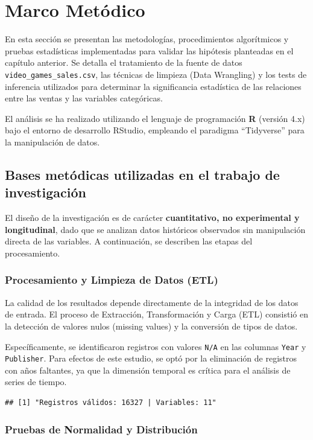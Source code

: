 \documentclass[oneside,11pt]{Latex/Classes/PhDthesisPSnPDF}
\begin{document}
\chapter{Marco Metódico}

En esta sección se presentan las metodologías, procedimientos
algorítmicos y pruebas estadísticas implementadas para validar las
hipótesis planteadas en el capítulo anterior. Se detalla el tratamiento
de la fuente de datos \texttt{video\_games\_sales.csv}, las técnicas de
limpieza (Data Wrangling) y los tests de inferencia utilizados para
determinar la significancia estadística de las relaciones entre las
ventas y las variables categóricas.

El análisis se ha realizado utilizando el lenguaje de programación
\textbf{R} (versión 4.x) bajo el entorno de desarrollo RStudio,
empleando el paradigma ``Tidyverse'' para la manipulación de datos.

\section{Bases metódicas utilizadas en el trabajo de investigación}

El diseño de la investigación es de carácter \textbf{cuantitativo, no
experimental y longitudinal}, dado que se analizan datos históricos
observados sin manipulación directa de las variables. A continuación, se
describen las etapas del procesamiento.

\subsection{Procesamiento y Limpieza de Datos (ETL)}

La calidad de los resultados depende directamente de la integridad de
los datos de entrada. El proceso de Extracción, Transformación y Carga
(ETL) consistió en la detección de valores nulos (missing values) y la
conversión de tipos de datos.

Específicamente, se identificaron registros con valores \texttt{N/A} en
las columnas \texttt{Year} y \texttt{Publisher}. Para efectos de este
estudio, se optó por la eliminación de registros con años faltantes, ya
que la dimensión temporal es crítica para el análisis de series de
tiempo.

\begin{verbatim}
## [1] "Registros válidos: 16327 | Variables: 11"
\end{verbatim}

\subsection{Pruebas de Normalidad y Distribución}
\end{document}

